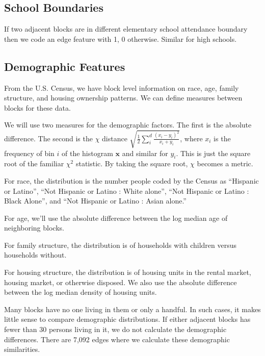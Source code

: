 \documentclass[12pt,letter]{article}\usepackage[]{graphicx}\usepackage[]{color}
\let\cite=\citep
\begin{document}
\subsection*{School Boundaries}
If two adjacent blocks are in different elementary school attendance boundary
then we code an edge feature with 1, 0 otherwise. Similar for high schools.

\subsection*{Demographic Features}
From the U.S. Census, we have block level information on race, age, family
structure, and housing ownership patterns. We can define measures between
blocks for these data.

We will use two measures for the demographic factors. The first is the
absolute difference. The second is the $\chi$ distance $\sqrt{
\frac{1}{2} \sum_i^d \frac{(x_i - y_i)^2}{x_i + y_i}}$, where $x_i$ is
the frequency of bin $i$ of the histogram $\mathbf{x}$ and similar for
$y_i$. This is just the square root of the familiar $\chi^2$ statistic. By
taking the square root, $\chi$ becomes a metric.\cite{pele_distance_2011}

For race, the distribution is the number people coded by the Census as
``Hispanic or Latino'', ``Not Hispanic or Latino : White alone'', ``Not Hispanic
or Latino : Black Alone'', and ``Not Hispanic or Latino : Asian alone.''

For age, we'll use the absolute difference between the log median age of
neighboring blocks.

For family structure, the distribution is of households with children
versus households without. 

For housing structure, the distribution is of housing units in the
rental market, housing market, or otherwise disposed. We also use the
absolute difference between the log median density of housing units.

Many blocks have no one living in them or only a handful. In such
cases, it makes little sense to compare demographic distributions. If
either adjacent blocks has fewer than 30 persons living in it, we do
not calculate the demographic differences. There are
7,092 edges where we calculate these
demographic similarities.
\end{document}
